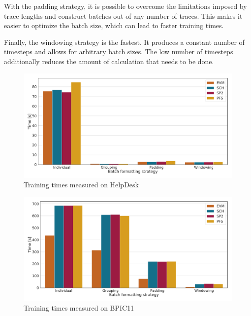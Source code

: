 With the padding strategy, it is possible to overcome the limitations imposed by trace lengths and construct batches out of any number of traces. This makes it easier to optimize the batch size, which can lead to faster training times.

Finally, the windowing strategy is the fastest.
It produces a constant number of timesteps and allows for arbitrary batch sizes.
The low number of timesteps additionally reduces the amount of calculation that needs to be done.

\begin{figure}
    \centering
    \includegraphics[width=\textwidth]{gfx/helpdesk/train_timings.pdf}
    \caption{Training times measured on HelpDesk}
    \label{fig:helpdesk-training-timings}
\end{figure}
\begin{figure}
    \centering
    \includegraphics[width=\textwidth]{gfx/bpic2011/train_timings.pdf}
    \caption{Training times measured on BPIC11}
    \label{fig:BPIC11-training-timings}
\end{figure}
